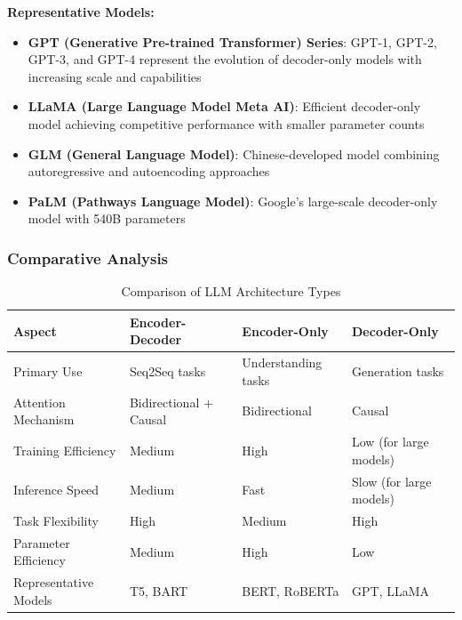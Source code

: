 \documentclass[12pt,a4paper]{article}
\begin{document}
\textbf{Representative Models:}
\begin{itemize}
    \item \textbf{GPT (Generative Pre-trained Transformer) Series}: GPT-1, GPT-2, GPT-3, and GPT-4 represent the evolution of decoder-only models with increasing scale and capabilities
    \item \textbf{LLaMA (Large Language Model Meta AI)}: Efficient decoder-only model achieving competitive performance with smaller parameter counts
    \item \textbf{GLM (General Language Model)}: Chinese-developed model combining autoregressive and autoencoding approaches
    \item \textbf{PaLM (Pathways Language Model)}: Google's large-scale decoder-only model with 540B parameters
\end{itemize}

\subsubsection{Comparative Analysis}


\begin{table}[H]
\centering
\caption{Comparison of LLM Architecture Types}
\label{tab:llm_comparison}
\begin{tabular}{|l|l|l|l|}
\hline
\textbf{Aspect} & \textbf{Encoder-Decoder} & \textbf{Encoder-Only} & \textbf{Decoder-Only} \\
\hline
Primary Use & Seq2Seq tasks & Understanding tasks & Generation tasks \\
\hline
Attention Mechanism & Bidirectional + Causal & Bidirectional & Causal \\
\hline
Training Efficiency & Medium & High & Low (for large models) \\
\hline
Inference Speed & Medium & Fast & Slow (for large models) \\
\hline
Task Flexibility & High & Medium & High \\
\hline
Parameter Efficiency & Medium & High & Low \\
\hline
Representative Models & T5, BART & BERT, RoBERTa & GPT, LLaMA \\
\hline
\end{tabular}
\end{table}
\end{document}
